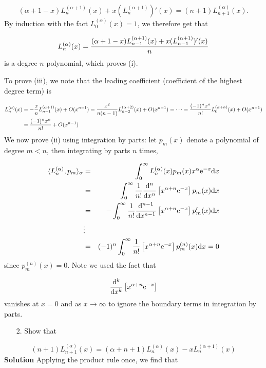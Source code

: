 \documentclass[12pt,a4paper]{article}
\begin{document}
\[
(\alpha+1 -x)L_n^{(\alpha+1)}(x) + x(L_n^{(\alpha+1)})'(x) = (n+1) L_{n+1}^{(\alpha)}(x).
\]
By induction with the fact $L_0^{(\alpha)}(x) = 1$, we therefore get that

\[
L_n^{(\alpha)}(x) = {(\alpha+1 -x)L_{n-1}^{(\alpha+1)}(x) + x(L_{n-1}^{(\alpha+1)})'(x) \over n}
\]
is a degree $n$ polynomial, which proves (i). 

To prove (iii), we note that the leading coefficient (coefficient of the highest degree term) is


\begin{align*}
L_n^{(\alpha)}(x) &= -{x \over n} L_{n-1}^{(\alpha+1)}(x) +O(x^{n-1}) =   {x^2 \over n(n-1)} L_{n-2}^{(\alpha+2)}(x) +O(x^{n-1}) = \cdots 
= {(-1)^n x^n \over n!} L_0^{(\alpha+n)}(x) +O(x^{n-1}) \\
&= {(-1)^n x^n \over n!} +O(x^{n-1})
\end{align*}
We now prove (ii) using integration by parts: let $p_m(x)$ denote a polynomial of degree $m <n$, then integrating by parts $n$ times,


\begin{eqnarray*}
\langle  L_n^{(\alpha)}, p_m \rangle_{\alpha} &=& \int_0^\infty L_n^{(\alpha)}(x) p_m(x) x^\alpha {\rm e}^{-x} {\rm d} x \\
&=&
\int_0^\infty  {1 \over n!} {{\rm d}^n \over {\rm d} x^n}\left[x^{\alpha+n}{\rm e}^{-x}\right]  p_m(x)  {\rm d} x \\
&=&
-\int_0^\infty  {1 \over n!} {{\rm d}^{n-1} \over {\rm d} x^{n-1}}\left[x^{\alpha+n}{\rm e}^{-x}\right]  p_m'(x)  {\rm d} x \\
&\vdots & \\
&=& (-1)^n \int_0^\infty  {1 \over n!} \left[x^{\alpha+n}{\rm e}^{-x}\right]  p_m^{(n)}(x)  {\rm d} x = 0
\end{eqnarray*}
since $p_m^{(n)}(x) = 0$. Note we used the fact that

\[
{{\rm d}^k \over {\rm d} x^k}\left[x^{\alpha+n}{\rm e}^{-x}\right]
\]
vanishes at $x = 0$ and as $x \to \infty$ to ignore the boundary terms in integration by parts.

\begin{itemize}
\item[2. ] Show that

\end{itemize}
\[
(n+1) L_{n+1}^{(\alpha)}(x) = (\alpha+n+1)L_n^{(\alpha)}(x) -   xL_n^{(\alpha+1)}(x)
\]
\textbf{Solution} Applying the product rule once, we find that
\end{document}
